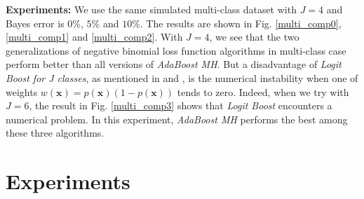 \documentclass[a4paper,twoside,12pt]{article}
\begin{document}
\begin{center}
\end{center}

\textbf{Experiments:} We use the same simulated multi-class dataset with $J = 4$ and Bayes error is $0\%$, $5\%$ and $10\%$. The results are shown in Fig. \ref{multi_comp0}, \ref{multi_comp1} and \ref{multi_comp2}. With $J=4$, we see that the two generalizations of negative binomial loss function algorithms in multi-class case perform better than all versions of \textsl{AdaBoost MH}. But a disadvantage of \textsl{Logit Boost for J classes}, as mentioned in \cite{boost} and \cite{trebst}, is the numerical instability when one of weights $w(\textbf{x}) = p(\textbf{x})(1 - p(\textbf{x}))$ tends to zero. Indeed, when we try with $J=6$, the result in Fig. \ref{multi_comp3} shows that \textsl{Logit Boost} encounters a numerical problem. In this experiment, \textsl{AdaBoost MH} performs the best among these three algorithms.

\section{Experiments}
\end{document}

